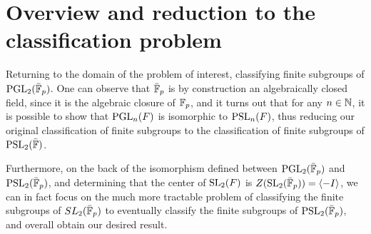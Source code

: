 








\section{Overview and reduction to the classification problem}

Returning to the domain of the problem of interest, classifying finite subgroups of $\operatorname{PGL}_2(\bar{\mathbb{F}}_p)$. One can observe that $\bar{\mathbb{F}}_p$ is by construction an algebraically closed field, since it is the algebraic closure of $\mathbb{F}_p$,
and it turns out that for any $n \in \mathbb{N}$, it is possible to show that $\operatorname{PGL}_n(F)$ is isomorphic to $\operatorname{PSL}_n(F)$, thus reducing our original classification of finite subgroups to the classification of finite subgroups of $\operatorname{PSL}_2(\bar{\mathbb{F}})$.

Furthermore, on the back of the isomorphism defined between $\operatorname{PGL}_2(\bar{\mathbb{F}}_p)$ and $\operatorname{PSL}_2(\bar{\mathbb{F}}_p)$, and determining that the center of $\operatorname{SL}_2(F)$ is $Z(\operatorname{SL}_2(\bar{\mathbb{F}}_p)) = \langle -I\rangle$, we can in fact focus on the much more tractable problem of 
classifying the finite subgroups of $SL_2(\bar{\mathbb{F}}_p)$ to eventually classify the finite subgroups of $\operatorname{PSL}_2(\bar{\mathbb{F}}_p)$, and overall obtain our desired result. 

